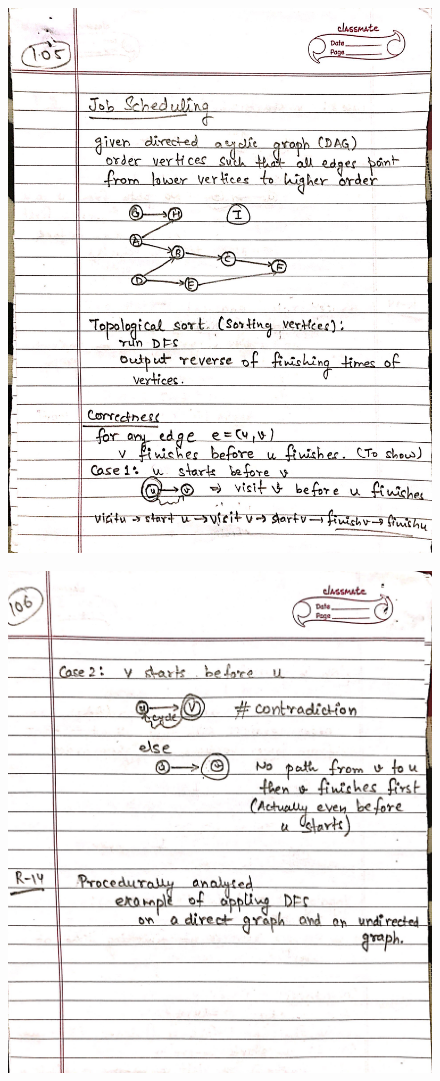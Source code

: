 \newpage
\begin{figure}[H]
    \centering
    \includegraphics[scale=0.25]{"./MIT-6.006/MIT-6006-105"}
\end{figure}
\newpage
\begin{figure}[H]
    \centering
    \includegraphics[scale=0.25]{"./MIT-6.006/MIT-6006-106"}
\end{figure}
